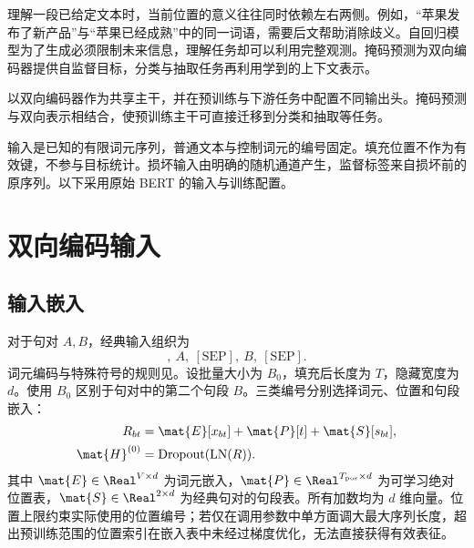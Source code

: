 \documentclass[../textbook.tex]{subfiles}
\begin{document}
\fi
{}

理解一段已给定文本时，当前位置的意义往往同时依赖左右两侧。例如，“苹果发布了新产品”与“苹果已经成熟”中的同一词语，需要后文帮助消除歧义。自回归模型为了生成必须限制未来信息，理解任务却可以利用完整观测。掩码预测为双向编码器提供自监督目标，分类与抽取任务再利用学到的上下文表示。

以双向编码器作为共享主干，并在预训练与下游任务中配置不同输出头\cite{devlinBERTPretrainingDeep2019}。掩码预测与双向表示相结合，使预训练主干可直接迁移到分类和抽取等任务。

\begin{assumption}
输入是已知的有限词元序列，普通文本与控制词元的编号固定。填充位置不作为有效键，不参与目标统计。损坏输入由明确的随机通道产生，监督标签来自损坏前的原序列。以下采用原始 BERT 的输入与训练配置。
\end{assumption}

\section{双向编码输入}

\subsection{输入嵌入}
对于句对 $A,B$，经典输入组织为
\begin{equation}
 [\mathrm{CLS}],\ A,\ [\mathrm{SEP}],\ B,\ [\mathrm{SEP}].
\end{equation}
词元编码与特殊符号的规则见。设批量大小为 $B_0$，填充后长度为 $T$，隐藏宽度为 $d$。使用 $B_0$ 区别于句对中的第二个句段 $B$。三类编号分别选择词元、位置和句段嵌入：
\begin{equation}\label{eq:mlm-input}
 \begin{aligned}
  R_{bt}&=\mat{E}[x_{bt}]+\mat{P}[t]+\mat{S}[s_{bt}],\\
  \mat{H}^{(0)}&=\operatorname{Dropout}(\operatorname{LN}(R)).
 \end{aligned}
\end{equation}
其中 $\mat{E}\in\Real^{V\times d}$ 为词元嵌入，$\mat{P}\in\Real^{T_{\mathrm{pos}}\times d}$ 为可学习绝对位置表，$\mat{S}\in\Real^{2\times d}$ 为经典句对的句段表。所有加数均为 $d$ 维向量。位置上限约束实际使用的位置编号；若仅在调用参数中单方面调大最大序列长度，超出预训练范围的位置索引在嵌入表中未经过梯度优化，无法直接获得有效表征。
\end{document}
